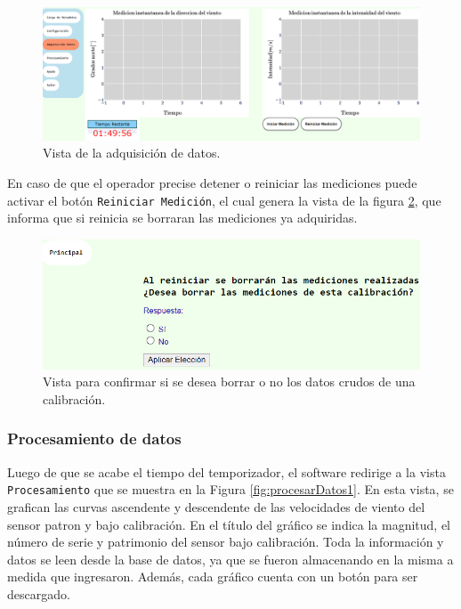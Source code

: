 \begin{figure}[H]
    \centering
    \includegraphics[width=1\linewidth]{Figuras/AplicacionWeb/frondend/adquisicionDatos.png}
    \caption{Vista de la adquisición de datos.}
    \label{fig:adquisicionDatos}
\end{figure}

En caso de que el operador precise detener o reiniciar las mediciones puede activar el botón \texttt{Reiniciar Medición}, el cual genera la vista de la figura \ref{fig:borrarMediciones}, que informa que si reinicia se borraran las mediciones ya adquiridas.

\begin{figure}[H]
    \centering
    \includegraphics[width=0.8\linewidth]{Figuras/AplicacionWeb/frondend/borrarMediciones.png}
    \caption{Vista para confirmar si se desea borrar o no los datos crudos de una calibración.}
    \label{fig:borrarMediciones}
\end{figure}



\subsubsection{Procesamiento de datos}\label{sec:ProcesamientoDatos}
Luego de que se acabe el tiempo del temporizador, el software redirige a la vista \texttt{Procesamiento} que se muestra en la Figura \ref{fig:procesarDatos1}. En esta vista, se grafican las curvas ascendente y descendente de las velocidades de viento del sensor patron y bajo calibración. En el título del gráfico se indica la magnitud, el número de serie y patrimonio del sensor bajo calibración. Toda la información y datos se leen desde la base de datos, ya que se fueron almacenando en la misma a medida que ingresaron. Además, cada gráfico cuenta con un botón para ser descargado.

